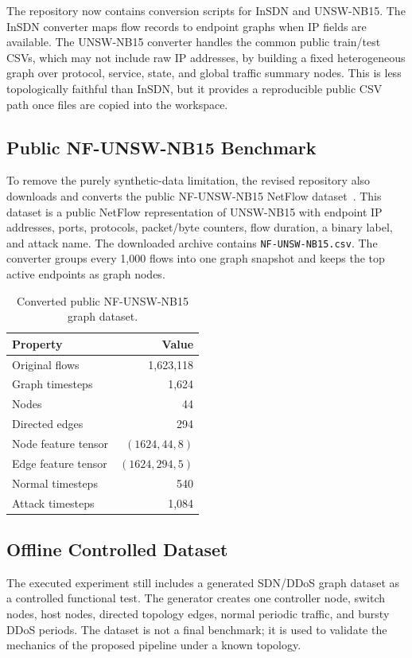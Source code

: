 \documentclass[runningheads]{llncs}
\begin{document}
The repository now contains conversion scripts for InSDN and UNSW-NB15. The
InSDN converter maps flow records to endpoint graphs when IP fields are
available. The UNSW-NB15 converter handles the common public train/test CSVs,
which may not include raw IP addresses, by building a fixed heterogeneous graph
over protocol, service, state, and global traffic summary nodes. This is less
topologically faithful than InSDN, but it provides a reproducible public CSV
path once files are copied into the workspace.

\subsection{Public NF-UNSW-NB15 Benchmark}

To remove the purely synthetic-data limitation, the revised repository also
downloads and converts the public NF-UNSW-NB15 NetFlow dataset~\cite{sarhan2021netflow}.
This dataset is a public NetFlow representation of UNSW-NB15 with endpoint IP
addresses, ports, protocols, packet/byte counters, flow duration, a binary
label, and attack name. The downloaded archive contains
\texttt{NF-UNSW-NB15.csv}. The converter groups every 1,000 flows into one
graph snapshot and keeps the top active endpoints as graph nodes.

\begin{table}[t]
\centering
\caption{Converted public NF-UNSW-NB15 graph dataset.}
\label{tab:nfunsw}
\begin{tabular}{lr}
\toprule
Property & Value \\
\midrule
Original flows & 1,623,118 \\
Graph timesteps & 1,624 \\
Nodes & 44 \\
Directed edges & 294 \\
Node feature tensor & $(1624, 44, 8)$ \\
Edge feature tensor & $(1624, 294, 5)$ \\
Normal timesteps & 540 \\
Attack timesteps & 1,084 \\
\bottomrule
\end{tabular}
\end{table}

\subsection{Offline Controlled Dataset}

The executed experiment still includes a generated SDN/DDoS graph dataset as a
controlled functional test. The generator creates one controller node, switch
nodes, host nodes, directed topology edges, normal periodic traffic, and bursty
DDoS periods. The dataset is not a final benchmark; it is used to validate the
mechanics of the proposed pipeline under a known topology.
\end{document}
